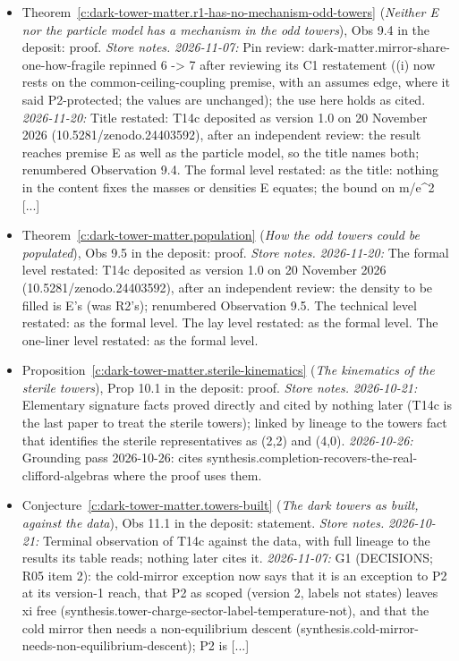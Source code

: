 \documentclass[11pt]{article}
\theoremstyle{definition}
\theoremstyle{plain}
\begin{document}
\begin{itemize}
\item Theorem~\ref{c:dark-tower-matter.r1-has-no-mechanism-odd-towers} (\emph{Neither E nor the particle model has a mechanism in the odd towers}), Obs 9.4 in the deposit: proof. \emph{Store notes.} \emph{2026-11-07:} Pin review: dark-matter.mirror-share-one-how-fragile repinned 6 -> 7 after reviewing its C1 restatement ((i) now rests on the common-ceiling-coupling premise, with an assumes edge, where it said P2-protected; the values are unchanged); the use here holds as cited. \emph{2026-11-20:} Title restated: T14c deposited as version 1.0 on 20 November 2026 (10.5281/zenodo.24403592), after an independent review: the result reaches premise E as well as the particle model, so the title names both; renumbered Observation 9.4. The formal level restated: as the title: nothing in the content fixes the masses or densities E equates; the bound on m/e\^{}2 [...]
\item Theorem~\ref{c:dark-tower-matter.population} (\emph{How the odd towers could be populated}), Obs 9.5 in the deposit: proof. \emph{Store notes.} \emph{2026-11-20:} The formal level restated: T14c deposited as version 1.0 on 20 November 2026 (10.5281/zenodo.24403592), after an independent review: the density to be filled is E's (was R2's); renumbered Observation 9.5. The technical level restated: as the formal level. The lay level restated: as the formal level. The one-liner level restated: as the formal level.
\item Proposition~\ref{c:dark-tower-matter.sterile-kinematics} (\emph{The kinematics of the sterile towers}), Prop 10.1 in the deposit: proof. \emph{Store notes.} \emph{2026-10-21:} Elementary signature facts proved directly and cited by nothing later (T14c is the last paper to treat the sterile towers); linked by lineage to the towers fact that identifies the sterile representatives as (2,2) and (4,0). \emph{2026-10-26:} Grounding pass 2026-10-26: cites synthesis.completion-recovers-the-real-clifford-algebras where the proof uses them.
\item Conjecture~\ref{c:dark-tower-matter.towers-built} (\emph{The dark towers as built, against the data}), Obs 11.1 in the deposit: statement. \emph{Store notes.} \emph{2026-10-21:} Terminal observation of T14c against the data, with full lineage to the results its table reads; nothing later cites it. \emph{2026-11-07:} G1 (DECISIONS; R05 item 2): the cold-mirror exception now says that it is an exception to P2 at its version-1 reach, that P2 as scoped (version 2, labels not states) leaves xi free (synthesis.tower-charge-sector-label-temperature-not), and that the cold mirror then needs a non-equilibrium descent (synthesis.cold-mirror-needs-non-equilibrium-descent); P2 is [...]
\end{itemize}
\end{document}
